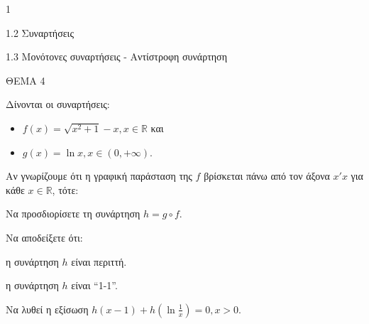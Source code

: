\begin{ylh}{1}
    \item 1.2 Συναρτήσεις
    \item 1.3 Μονότονες συναρτήσεις - Αντίστροφη συνάρτηση
\end{ylh}
ΘΕΜΑ 4

Δίνονται οι συναρτήσεις:
\begin{itemize}
    \item $f(x)=\sqrt{x^2+1}-x, x \in \mathbb{R}$ και
    \item $g(x)=\ln x, x \in (0,+\infty)$.
\end{itemize}
Αν γνωρίζουμε ότι η γραφική παράσταση της $f$ βρίσκεται πάνω από τον άξονα $x'x$ για κάθε $x \in \mathbb{R}$, τότε:

\begin{alist}
\item Να προσδιορίσετε τη συνάρτηση $h=g \circ f$. 
\item Να αποδείξετε ότι:
    \begin{rlist}
    \item[i.] η συνάρτηση $h$ είναι περιττή. 
    \item[ii.] η συνάρτηση $h$ είναι “1-1”. 
    \end{rlist}
\item Να λυθεί η εξίσωση $h(x-1)+h\left(\ln \frac{1}{x}\right)=0, x>0$. 
\end{alist}